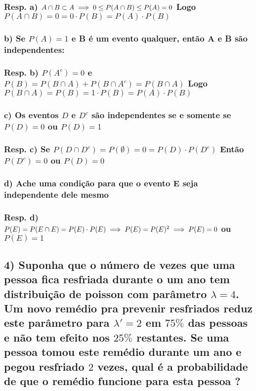 \documentclass[english]{article}
\begin{document}
\subsubsection*{\textmd{Resp. a) $A\cap B\subset A\protect\implies0\le P(A\cap B)\le P(A)=0$
Logo $P(A\cap B)=0=0\cdot P(B)=P(A)\cdot P(B)$}}


\subsubsection*{\textmd{b) Se $P(A)=1$ e B é um evento qualquer, então A e B são
independentes:}}


\subsubsection*{\textmd{Resp. b) $P(A^{c})=0$ e $P(B)=P(B\cap A)+P(B\cap A^{c})=P(B\cap A)$
Logo $P(B\cap A)=P(B)=1\cdot P(B)=P(A)\cdot P(B)$}}


\subsubsection*{\textmd{c) Os eventos $D$ e $D^{c}$ são independentes se e somente
se $P(D)=0$ ou $P(D)=1$}}


\subsubsection*{\textmd{Resp. c) Se $P(D\cap D^{c})=P(\emptyset)=0=P(D)\cdot P(D^{c})$
Então $P(D^{c})=0$ ou $P(D)=0$ }}


\subsubsection*{\textmd{d) Ache uma condição para que o evento E seja independente
dele mesmo}}


\subsubsection*{\textmd{Resp. d) $P(E)=P(E\cap E)=P(E)\cdot P(E)\protect\implies P(E)=P(E)^{2}\protect\implies P(E)=0$
ou $P(E)=1$}}

\textbf{\textcompwordmark{}}


\subsection*{\textmd{4) Suponha que o número de vezes que uma pessoa fica resfriada
durante o um ano tem distribuição de poisson com parâmetro $\lambda=4$.
Um novo remédio pra prevenir resfriados reduz este parâmetro para
$\lambda'=2$ em $75\%$ das pessoas e não tem efeito nos $25\%$
restantes. Se uma pessoa tomou este remédio durante um ano e pegou
resfriado $2$ vezes, qual é a probabilidade de que o remédio funcione
para esta pessoa ?}}
\end{document}
